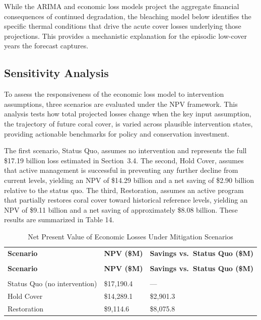 \documentclass[10pt,letterpaper]{article}
\newcounter{assumption}
\newcounter{gs}
\begin{document}
While the ARIMA and economic loss models project the aggregate financial consequences of continued degradation, the bleaching model below identifies the specific thermal conditions that drive the acute cover losses underlying those projections. This provides a mechanistic explanation for the episodic low-cover years the forecast captures.

\subsection{Sensitivity Analysis}

To assess the responsiveness of the economic loss model to intervention assumptions, three scenarios are evaluated under the NPV framework. This analysis tests how total projected losses change when the key input assumption, the trajectory of future coral cover, is varied across plausible intervention states, providing actionable benchmarks for policy and conservation investment.

The first scenario, Status Quo, assumes no intervention and represents the full \$17.19 billion loss estimated in Section~3.4. The second, Hold Cover, assumes that active management is successful in preventing any further decline from current levels, yielding an NPV of \$14.29 billion and a net saving of \$2.90 billion relative to the status quo. The third, Restoration, assumes an active program that partially restores coral cover toward historical reference levels, yielding an NPV of \$9.11 billion and a net saving of approximately \$8.08 billion. These results are summarized in Table 14.

\begingroup
{}
\renewcommand{\arraystretch}{1.1}
\begin{xltabular}{\textwidth}{>{\centering\arraybackslash}p{4.8cm}
                >{\centering\arraybackslash}p{2.3cm}
                >{\centering\arraybackslash}X}
\caption{Net Present Value of Economic Losses Under Mitigation Scenarios}
\label{tab:mitigation-npv}\\
\toprule
{}\textbf{Scenario} & \textbf{NPV (\$M)} & \textbf{Savings vs.\ Status Quo (\$M)} \\
\midrule
\endfirsthead
{} \\[4pt]
\toprule
{}\textbf{Scenario} & \textbf{NPV (\$M)} & \textbf{Savings vs.\ Status Quo (\$M)} \\
\midrule
\endhead
\midrule
{} \\
\endfoot
\bottomrule
\endlastfoot
Status Quo (no intervention)  & \$17{,}190.4 & ---         \\
Hold Cover                    & \$14{,}289.1 & \$2{,}901.3  \\
Restoration                   & \$9{,}114.6  & \$8{,}075.8  \\
\end{xltabular}
\endgroup
\end{document}
